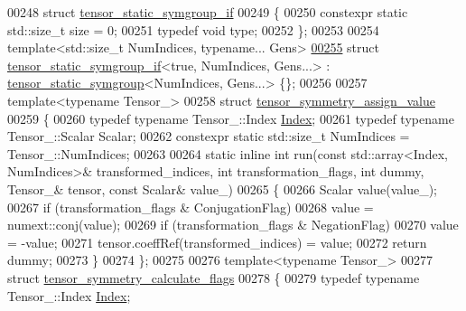 \begin{DoxyCode}
00248 \textcolor{keyword}{struct }\hyperlink{struct_eigen_1_1internal_1_1tensor__static__symgroup__if}{tensor\_static\_symgroup\_if}
00249 \{
00250   constexpr \textcolor{keyword}{static} std::size\_t size = 0;
00251   \textcolor{keyword}{typedef} \textcolor{keywordtype}{void} type;
00252 \};
00253 
00254 \textcolor{keyword}{template}<std::size\_t NumIndices, \textcolor{keyword}{typename}... Gens>
\hyperlink{struct_eigen_1_1internal_1_1tensor__static__symgroup__if_3_01true_00_01_num_indices_00_01_gens_8_8_8_01_4}{00255} \textcolor{keyword}{struct }\hyperlink{struct_eigen_1_1internal_1_1tensor__static__symgroup__if}{tensor\_static\_symgroup\_if}<true, NumIndices, Gens...> : 
      \hyperlink{struct_eigen_1_1internal_1_1tensor__static__symgroup}{tensor\_static\_symgroup}<NumIndices, Gens...> \{\};
00256 
00257 \textcolor{keyword}{template}<\textcolor{keyword}{typename} Tensor\_>
00258 \textcolor{keyword}{struct }\hyperlink{struct_eigen_1_1internal_1_1tensor__symmetry__assign__value}{tensor\_symmetry\_assign\_value}
00259 \{
00260   \textcolor{keyword}{typedef} \textcolor{keyword}{typename} Tensor\_::Index \hyperlink{namespace_eigen_a62e77e0933482dafde8fe197d9a2cfde}{Index};
00261   \textcolor{keyword}{typedef} \textcolor{keyword}{typename} Tensor\_::Scalar Scalar;
00262   constexpr \textcolor{keyword}{static} std::size\_t NumIndices = Tensor\_::NumIndices;
00263 
00264   \textcolor{keyword}{static} \textcolor{keyword}{inline} \textcolor{keywordtype}{int} run(\textcolor{keyword}{const} std::array<Index, NumIndices>& transformed\_indices, \textcolor{keywordtype}{int} transformation\_flags,
       \textcolor{keywordtype}{int} dummy, Tensor\_& tensor, \textcolor{keyword}{const} Scalar& value\_)
00265   \{
00266     Scalar value(value\_);
00267     \textcolor{keywordflow}{if} (transformation\_flags & ConjugationFlag)
00268       value = numext::conj(value);
00269     \textcolor{keywordflow}{if} (transformation\_flags & NegationFlag)
00270       value = -value;
00271     tensor.coeffRef(transformed\_indices) = value;
00272     \textcolor{keywordflow}{return} dummy;
00273   \}
00274 \};
00275 
00276 \textcolor{keyword}{template}<\textcolor{keyword}{typename} Tensor\_>
00277 \textcolor{keyword}{struct }\hyperlink{struct_eigen_1_1internal_1_1tensor__symmetry__calculate__flags}{tensor\_symmetry\_calculate\_flags}
00278 \{
00279   \textcolor{keyword}{typedef} \textcolor{keyword}{typename} Tensor\_::Index \hyperlink{namespace_eigen_a62e77e0933482dafde8fe197d9a2cfde}{Index};

\end{DoxyCode}
